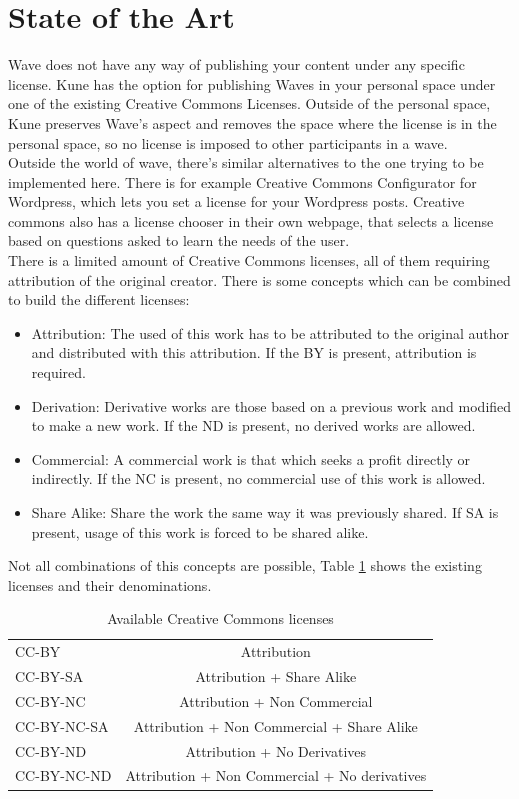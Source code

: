 \section{State of the Art}
\label{subsec:cc_soa}
Wave does not have any way of publishing your content under any specific license. Kune has the option for publishing Waves in your personal space under one of the existing Creative Commons Licenses. Outside of the personal space, Kune preserves Wave's aspect and removes the space where the license is in the personal space, so no license is imposed to other participants in a wave.\\[.2cm]
Outside the world of wave, there's similar alternatives to the one trying to be implemented here. There is for example Creative Commons Configurator for Wordpress, which lets you set a license for your Wordpress posts. Creative commons also has a license chooser \cite{ref:cc_chooser} in their own webpage, that selects a license based on questions asked to learn the needs of the user.\\[.2cm]
There is a limited amount of Creative Commons licenses, all of them requiring attribution of the original creator. There is some concepts which can be combined to build the different licenses:
\begin{itemize}
  \item Attribution: The used of this work has to be attributed to the original author and distributed with this attribution. If the BY is present, attribution is required.
  \item Derivation: Derivative works are those based on a previous work and modified to make a new work. If the ND is present, no derived works are allowed.
  \item Commercial: A commercial work is that which seeks a profit directly or indirectly. If the NC is present, no commercial use of this work is allowed.
  \item Share Alike: Share the work the same way it was previously shared. If SA is present, usage of this work is forced to be shared alike.
\end{itemize}
Not all combinations of this concepts are possible, Table \ref{fig:cc_licenses} shows the existing licenses and their denominations.
\begin{table}[H]
  \begin{center}
    \begin{tabular}{ | l | c |}
      \hline
      CC-BY & Attribution\\
      CC-BY-SA & Attribution + Share Alike\\
      CC-BY-NC & Attribution + Non Commercial\\
      CC-BY-NC-SA & Attribution + Non Commercial + Share Alike\\
      CC-BY-ND & Attribution + No Derivatives\\
      CC-BY-NC-ND & Attribution + Non Commercial + No derivatives\\
      \hline
    \end{tabular}
  \end{center}
  \caption{Available Creative Commons licenses}
  \label{fig:cc_licenses}
\end{table}
